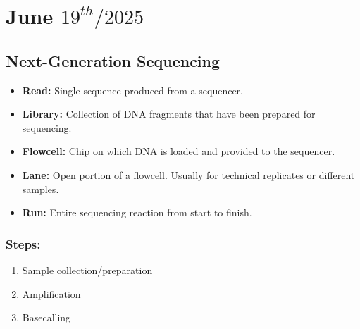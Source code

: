 \documentclass[../main.tex]{subfiles}
\begin{document}
\chapter{June $19^{th} / 2025$}
\label{ch:tufte-design}


\section{Next-Generation Sequencing} \cite{gencore_how_sequencing_works}

\begin{itemize}
    \item \textbf{Read:} Single sequence produced from a sequencer.
    \item \textbf{Library:} Collection of DNA fragments that have been prepared for sequencing.
    \item \textbf{Flowcell:} Chip on which DNA is loaded and provided to the sequencer.
    \item \textbf{Lane:} Open portion of a flowcell. Usually for technical replicates or different samples.
    \item \textbf{Run:} Entire sequencing reaction from start to finish.
\end{itemize}

\subsection*{Steps:} %
\begin{enumerate}
    \item Sample collection/preparation
    \item Amplification
    \item Basecalling
\end{enumerate}
\end{document}
